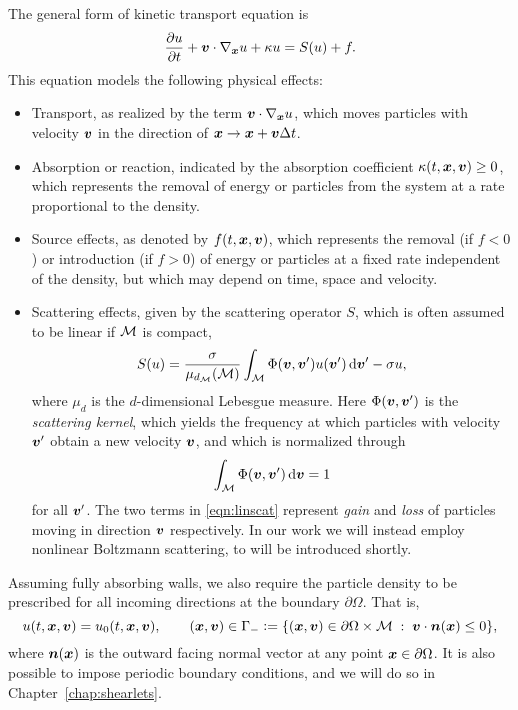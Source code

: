 The general form of kinetic transport equation is
\begin{equation} \label{eqn:kintr}
    \frac{\partial u}{\partial t} + {\bm v} \cdot \nabla_{\bm x} u + \kappa u = S(u) + f.
\end{equation}
This equation models the following physical effects:
\begin{itemize}
\item Transport, as realized by the term ${\bm v}\cdot\nabla_{\bm x} u$, which moves particles with velocity ${\bm v}$ in
the direction of ${\bm x}\to{\bm x}+{\bm v}\Delta t$.
\item Absorption or reaction, indicated by the absorption coefficient $\kappa(t,{\bm x},{\bm v}) \geq 0$, which
represents the removal of energy or particles from the system at a rate proportional to the density.
\item Source effects, as denoted by $f(t,{\bm x},{\bm v})$, which represents the removal (if $f < 0$) or introduction
(if $f > 0$) of energy or particles at a fixed rate independent of the density, but which may depend on time,
space and velocity.
\item Scattering effects, given by the scattering operator $S$, which is often assumed to be linear if $\mathcal{M}$
is compact,
\begin{equation} \label{eqn:linscat}
    S(u) = \frac{\sigma}{\mu_{d_{\mathcal{M}}}(\mathcal{M})}\int_{\mathcal{M}} \Phi({\bm v},{\bm v}') u({\bm v}') \,\mathrm{d}{\bm v}' - \sigma u,
\end{equation}
where $\mu_d$ is the $d$-dimensional Lebesgue measure. Here $\Phi({\bm v},{\bm v}')$ is the {\em scattering kernel},
which yields the frequency at which particles with velocity ${\bm v}'$ obtain a new velocity ${\bm v}$, and which
is normalized through
\[
    \int_{\mathcal{M}} \Phi({\bm v},{\bm v}') \,\mathrm{d}{\bm v} = 1
\]
for all ${\bm v}'$. The two terms in \eqref{eqn:linscat} represent {\em gain} and {\em loss} of particles moving
in direction ${\bm v}$ respectively. In our work we will instead employ nonlinear Boltzmann scattering, to will
be introduced shortly.
\end{itemize}

Assuming fully absorbing walls, we also require the particle density to be prescribed for all incoming
directions at the boundary $\partial\Omega$. That is,
\[
    u(t,{\bm x},{\bm v}) = u_0(t,{\bm x},{\bm v}), \qquad ({\bm x},{\bm v}) \in \Gamma_- \vcentcolon=
    \{ ({\bm x},{\bm v}) \in \partial\Omega \times \mathcal{M} \;:\; {\bm v} \cdot {\bm n}({\bm x}) \leq 0 \},
\]
where ${\bm n}({\bm x})$ is the outward facing normal vector at any point ${\bm x} \in \partial\Omega$. It is also possible
to impose periodic boundary conditions, and we will do so in Chapter~\ref{chap:shearlets}.

